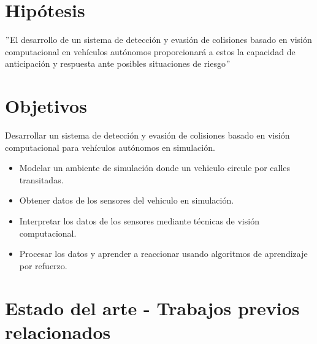 \documentclass[12pt,letterpaper,final]{article}
\begin{document}
    \section*{Hipótesis}
    \("\)El desarrollo de un sistema de detección y evasión de colisiones basado en visión computacional en vehículos autónomos
    proporcionará a estos la capacidad de anticipación y respuesta ante posibles situaciones de riesgo\("\)
    
    \section*{Objetivos}
    \newline
    \noindent Desarrollar un sistema de detección y evasión de colisiones basado en visión computacional para vehículos autónomos en simulación.
    \newline
    \newline
    \begin{itemize}
        \item Modelar un ambiente de simulación donde un vehiculo circule por calles transitadas.
        \item Obtener datos de los sensores del vehiculo en simulación.
        \item Interpretar los datos de los sensores mediante técnicas de visión computacional.
        \item Procesar los datos y aprender a reaccionar usando algoritmos de aprendizaje por refuerzo.
    \end{itemize}
    \clearpage

    \section*{Estado del arte - Trabajos previos relacionados}
    
\end{document}
